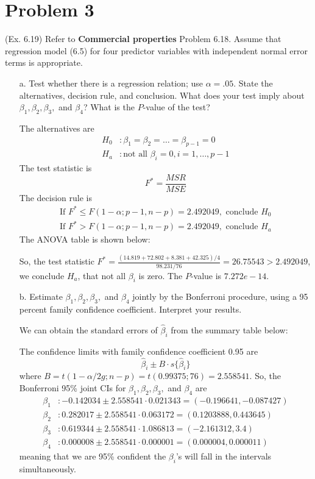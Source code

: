 \documentclass[10pt]{report}
\begin{document}
\section*{Problem 3}
(Ex. 6.19) Refer to \textbf{Commercial properties} Problem 6.18. Assume that regression model (6.5) for four predictor variables with independent normal error terms is appropriate.
\begin{enumerate}
	\item [a.]
	Test whether there is a regression relation; use $\alpha = .05$. State the alternatives, decision rule, and conclusion. What does your test imply about $\beta_1, \beta_2, \beta_3,$ and $\beta_4$? What is the $P$-value of the test?
	
	The alternatives are
	\begin{align*}
		H_0 &: \beta_1 = \beta_2 = \dots = \beta_{p-1} = 0\\
		H_a &: \text{not all } \beta_i=0, i=1,\dots,p-1
	\end{align*}
	The test statistic is
	\[
	F^* = \frac{MSR}{MSE}
	\]
	The decision rule is
	\begin{align*}
	\text{If } F^* \le F(1-\alpha; p-1, n-p) = 2.492049, \text{ conclude } H_0\\
	\text{If } F^* > F(1-\alpha; p-1, n-p) = 2.492049, \text{ conclude } H_a
	\end{align*}
	The ANOVA table is shown below:
	
	So, the test statistic $F^* = \frac{(14.819+72.802+8.381+42.325)/4}{98.231/76} = 26.75543 > 2.492049$, we conclude $H_a$, that not all $\beta_i$ is zero. The $P$-value is $7.272e-14$.
	
	\item [b.]
	Estimate $\beta_1, \beta_2, \beta_3,$ and $\beta_4$ jointly by the Bonferroni procedure, using a 95 percent family confidence coefficient. Interpret your results.
	
	We can obtain the standard errors of $\hat{\beta}_i$ from the summary table below:
	
	The confidence limits with family confidence coefficient 0.95 are
	\[
	\hat{\beta}_i \pm B\cdot s\{\hat{\beta}_i\}
	\]
	where $B = t(1-\alpha/2g; n-p) = t(0.99375; 76) = 2.558541$. So, the Bonferroni 95\% joint CIs for $\beta_1, \beta_2, \beta_3,$ and $\beta_4$ are
	\begin{align*}
		\beta_1 &: -0.142034 \pm 2.558541 \cdot 0.021343 = (-0.196641, -0.087427)\\
		\beta_2 &: 0.282017 \pm 2.558541 \cdot 0.063172 = (0.1203888, 0.443645)\\
		\beta_3 &: 0.619344 \pm 2.558541 \cdot 1.086813 = (-2.161312, 3.4)\\
		\beta_4 &: 0.000008 \pm 2.558541 \cdot 0.000001 = (0.000004, 0.000011)
	\end{align*}
	meaning that we are 95\% confident the $\beta_i$'s will fall in the intervals simultaneously.
	

\end{enumerate}
\end{document}

